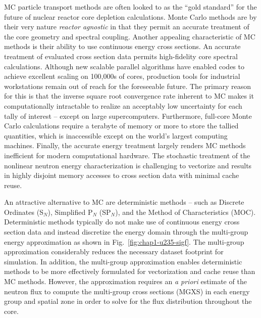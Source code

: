 
\ac{MC} particle transport methods are often looked to as the ``gold standard'' for the future of nuclear reactor core depletion calculations. Monte Carlo methods are by their very nature \textit{reactor agnostic} in that they permit an accurate treatment of the core geometry and spectral coupling. Another appealing characteristic of \ac{MC} methods is their ability to use continuous energy cross sections. An accurate treatment of evaluated cross section data permits high-fidelity core spectral calculations. Although new scalable parallel algorithms have enabled codes to achieve excellent scaling on 100,000s of cores, production tools for industrial workstations remain out of reach for the foreseeable future. The primary reason for this is that the inverse square root convergence rate inherent to \ac{MC} makes it computationally intractable to realize an acceptably low uncertainty for each tally of interest -- except on large supercomputers. Furthermore, full-core Monte Carlo calculations require a terabyte of memory or more to store the tallied quantities, which is inaccessible except on the world's largest computing machines. Finally, the accurate energy treatment largely renders \ac{MC} methods inefficient for modern computational hardware. The stochastic treatment of the nonlinear neutron energy characterization is challenging to vectorize and results in highly disjoint memory accesses to cross section data with minimal cache reuse. 

An attractive alternative to MC are deterministic methods -- such as Discrete Ordinates (S$_N$), Simplified P$_N$ (SP$_N$), and the Method of Characteristics (MOC). Deterministic methods typically do not make use of continuous energy cross section data and instead discretize the energy domain through the multi-group energy approximation as shown in Fig.~\ref{fig:chap1-u235-sigf}. The multi-group approximation considerably reduces the necessary dataset footprint for simulation. In addition, the multi-group approximation enables deterministic methods to be more effectively formulated for vectorization and cache reuse than \ac{MC} methods. However, the approximation requires an \textit{a priori} estimate of the neutron flux to compute the multi-group cross sections (MGXS) in each energy group and spatial zone in order to solve for the flux distribution throughout the core.

